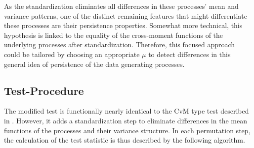 \documentclass[12pt, a4paper]{article}
\theoremstyle{MAstyle} \newtheorem{assumption}{Assumption}[section]
\theoremstyle{MAstyle} \newtheorem{definition}{Definition}[section]
\theoremstyle{MAstyle} \newtheorem{theorem}{Theorem}[section]
\begin{document}
		As the standardization eliminates all differences in these processes' mean and variance patterns, one of the distinct remaining features that might differentiate these processes are their persistence properties.
		Somewhat more technical, this hypothesis is linked to the equality of the cross-moment functions of the underlying processes after standardization.
		Therefore, this focused approach could be tailored by choosing an appropriate $\mu$ to detect differences in this general idea of persistence of the data generating processes. 
		
		\subsection{Test-Procedure}\label{persistence_test}
		The modified test is functionally nearly identical to the CvM type test described in \cite{bugni_permutation_2021}. However, it adds a standardization step to eliminate differences in the mean functions of the processes and their variance structure. In each permutation step, the calculation of the test statistic is thus described by the following algorithm.
		
\end{document}
